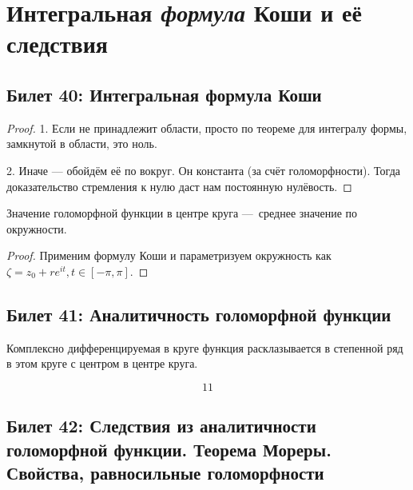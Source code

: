 \documentclass[12pt, a4paper, oneside]{memoir}
\begin{document}
\section{Интегральная \textit{формула} Коши и её следствия}

\subsection{Билет 40: Интегральная формула Коши}

\begin{theorem}

    \begin{proof}
        1. Если не принадлежит области, просто по теореме для интегралу формы, замкнутой в области, это ноль.

        2. Иначе — обойдём её по вокруг. Он константа (за счёт голоморфности). Тогда доказательство стремления к нулю даст нам постоянную нулёвость.
    \end{proof}
\end{theorem}

\begin{corollary}
     Значение голоморфной функции в центре круга — среднее значение по окружности.

    \begin{proof}
        Применим формулу Коши и параметризуем окружность как $\zeta = z_0 + re^{it}, t \in [-\pi, \pi]$.
    \end{proof}
\end{corollary}

\subsection{Билет 41: Аналитичность голоморфной функции}

\begin{theorem}
    Комплексно дифференцируемая в круге функция 
    расклазывается в степенной ряд в этом круге
    с центром в центре круга.

    \begin{equation}
        11
    \end{equation}
\end{theorem}

\subsection{Билет 42: Следствия из аналитичности голоморфной функции. Теорема Мореры. Свойства, равносильные голоморфности}
\end{document}
